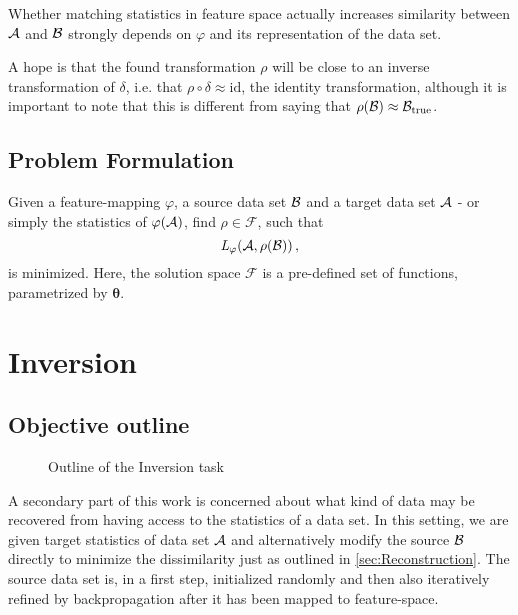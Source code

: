Whether matching statistics in feature space actually increases similarity between $\mathcal A$ and $\mathcal B$
strongly depends on $\varphi$ and its representation of the data set.

A hope is that the found transformation $\rho$ will be close to an inverse transformation
of $\delta$, i.e. that $\rho\circ\delta \approx \text{id}$, the identity transformation,
although it is important to note that this is different from saying that $\rho(\mathcal B) \approx \mathcal B_\text{true}$.


\subsection{Problem Formulation}
Given a feature-mapping $\varphi$, a source data set $\mathcal B$ and a target data set $\mathcal A$ - or simply the statistics of $\varphi(\mathcal A)$,  find $\rho \in \mathcal{F}$, such that
\[
     \textit{L} _\varphi (\mathcal A, \rho(\mathcal B)) \,,
\]
is minimized.
Here, the solution space $\mathcal F$ is a pre-defined set of functions, 
parametrized by $\boldsymbol \theta$.






\section{Inversion}
\label{sec:Inversion}

\subsection{Objective outline}

\begin{figure}[h]
    \centering
    
    \caption{Outline of the Inversion task}
    \label{fig:inversion_outline}
    \centering
\end{figure}

A secondary part of this work is concerned about what kind of data 
may be recovered from having access to the statistics of a data set.
In this setting, we are given target statistics of data set $\mathcal A$
and alternatively modify the source $\mathcal B$ directly to 
minimize the dissimilarity just as outlined in \ref{sec:Reconstruction}.
The source data set is, in a first step, initialized randomly and then also 
iteratively refined by backpropagation after it has been mapped to feature-space.



